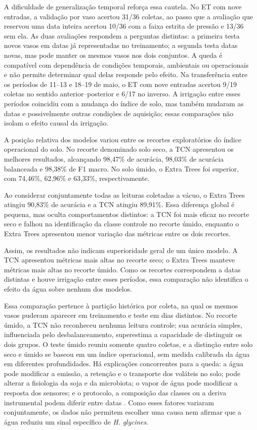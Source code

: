 A dificuldade de generalização temporal reforça essa cautela. No ET com
nove entradas, a validação por vaso acertou 31/36 coletas, ao passo que a
avaliação que reservou uma data inteira acertou 10/36 com a faixa estrita
de pressão e 13/36 sem ela. As duas avaliações respondem a perguntas
distintas: a primeira testa novos vasos em datas já representadas no
treinamento; a segunda testa datas novas, mas pode manter os mesmos vasos
nos dois conjuntos. A queda é compatível com dependência de condições
temporais, ambientais ou operacionais e não permite determinar qual delas
responde pelo efeito. Na transferência entre os períodos de 11--13 e
18--19 de maio, o ET com nove entradas acertou 9/19 coletas no sentido
anterior--posterior e 6/17 no inverso. A irrigação entre esses períodos
coincidiu com a mudança do índice de solo, mas também mudaram as datas e
possivelmente outras condições de aquisição; essas comparações não isolam
o efeito causal da irrigação.

A posição relativa dos modelos variou entre os recortes exploratórios do
índice operacional do solo. No recorte denominado solo seco, a
TCN apresentou os melhores resultados, alcançando 98,47\% de acurácia,
98,03\% de acurácia balanceada e 98,38\% de F1 macro. No solo úmido, o
Extra Trees foi superior, com 74,46\%, 62,96\% e 63,33\%, respectivamente.

Ao considerar conjuntamente todas as leituras coletadas a vácuo, o Extra
Trees atingiu 90,83\% de acurácia e a TCN atingiu 89,91\%. Essa diferença
global é pequena, mas oculta comportamentos distintos: a TCN foi mais
eficaz no recorte seco e falhou na identificação da classe controle no recorte
úmido, enquanto o Extra Trees apresentou menor variação das métricas entre os
dois recortes.

Assim, os resultados não indicam superioridade geral de um único modelo.
A TCN apresentou métricas mais altas no recorte seco; o Extra Trees manteve
métricas mais altas no recorte úmido. Como os recortes correspondem a datas
distintas e houve irrigação entre esses períodos, essa comparação não identifica o
efeito da água sobre nenhum dos modelos.

Essa comparação pertence à partição histórica por coleta, na qual os
mesmos vasos puderam aparecer em treinamento e teste em dias distintos.
No recorte úmido, a TCN não reconheceu nenhuma leitura controle; sua
acurácia simples, influenciada pelo desbalanceamento, superestima a
capacidade de distinguir os dois grupos. O teste úmido reuniu somente
quatro coletas, e a distinção entre solo seco e úmido se baseou em um
índice operacional, sem medida calibrada da água em diferentes
profundidades. Há explicações concorrentes para a queda: a água pode
modificar a emissão, a retenção e o transporte dos voláteis no solo;
pode alterar a fisiologia da soja e da microbiota; o vapor de água pode
modificar a resposta dos sensores; e o protocolo, a composição das
classes ou a deriva instrumental podem diferir entre datas
\cite{asensio2007,cellini2017}. Como esses fatores variaram conjuntamente,
os dados não permitem escolher uma causa nem afirmar que a água reduziu
um sinal específico de \textit{H. glycines}.


